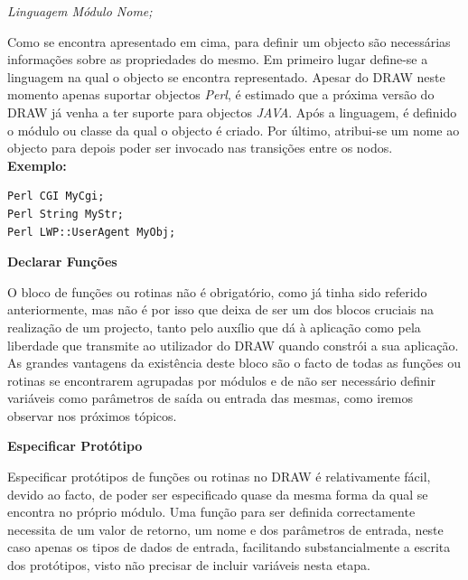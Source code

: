 \documentclass[a4paper]{article}
\begin{document}
\begin{center}
\emph{Linguagem Módulo Nome;}
\end{center}

Como se encontra apresentado em cima, para definir um objecto são necessárias informações sobre as propriedades do mesmo. Em primeiro
lugar define-se a linguagem na qual o objecto se encontra representado. Apesar do DRAW neste momento apenas suportar objectos
\emph{Perl}, é estimado que a próxima versão do DRAW já venha a ter suporte para objectos \emph{JAVA}.
Após a linguagem, é definido o módulo ou classe da qual o objecto é criado. Por último, atribui-se um nome ao objecto para depois poder
ser invocado nas transições entre os nodos.\\

\textbf{Exemplo:}

\begin{small}
\begin{lstlisting}
Perl CGI MyCgi;
Perl String MyStr;
Perl LWP::UserAgent MyObj;
\end{lstlisting}
\end{small}

\vspace{.6cm}

\begin{large}
\textbf{Declarar Funções}\\
\end{large}

\hspace{1cm}O bloco de funções ou rotinas não é obrigatório, como já tinha sido referido anteriormente, mas não é por isso que deixa de
ser um dos blocos cruciais na realização de um projecto, tanto pelo auxílio que dá à aplicação como pela liberdade que transmite ao
utilizador do DRAW quando constrói a sua aplicação. As grandes vantagens da existência deste bloco são o facto de todas as funções ou
rotinas se encontrarem agrupadas por módulos e de não ser necessário definir variáveis como parâmetros de saída ou entrada das mesmas,
como iremos observar nos próximos tópicos.\\

\begin{normalsize}
\textbf{Especificar Protótipo}\\
\end{normalsize}

\hspace{1cm}Especificar protótipos de funções ou rotinas no DRAW é relativamente fácil, devido ao facto, de poder ser especificado quase
da mesma forma da qual se encontra no próprio módulo. Uma função para ser definida correctamente necessita de um valor de retorno, um
nome e dos parâmetros de entrada, neste caso apenas os tipos de dados de entrada, facilitando substancialmente a escrita dos protótipos,
visto não precisar de incluir variáveis nesta etapa.
\end{document}
